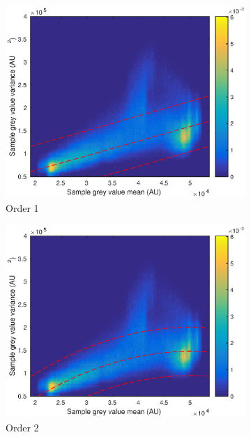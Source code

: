 \documentclass[12pt]{report}
\begin{document}
\begin{figure}
	\centering
	\begin{subfigure}{0.45\textwidth}
		\includegraphics[width=\textwidth]{figures/meanVar/order1.eps}
		\caption{Order 1}
	\end{subfigure}
	\begin{subfigure}{0.45\textwidth}
		\includegraphics[width=\textwidth]{figures/meanVar/order2.eps}
		\caption{Order 2}
	\end{subfigure}
	\begin{subfigure}{0.45\textwidth}

\end{subfigure}
\end{figure}
\end{document}
